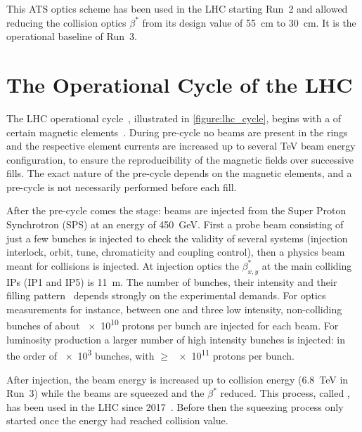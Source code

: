 This ATS optics scheme has been used in the LHC starting Run~\num{2} and allowed reducing the collision optics \(\beta^{\ast}\) from its design value of \qty{55}{\centi\meter} to \qty{30}{\centi\meter}.
It is the operational baseline of Run~\num{3}.


\section{The Operational Cycle of the LHC}
\label{section:lhc_operational_cycle}

The LHC operational cycle~\cite{Report:LHCModes}, illustrated in \cref{figure:lhc_cycle}, begins with a  of certain magnetic elements~\cite{Report:LHCMagnetsPreCycles}.
During pre-cycle no beams are present in the rings and the respective element currents are increased up to several \unit{\tera\electronvolt} beam energy configuration, to ensure the reproducibility of the magnetic fields over successive fills.
The exact nature of the pre-cycle depends on the magnetic elements, and a pre-cycle is not necessarily performed before each fill.

After the pre-cycle comes the  stage: beams are injected from the Super Proton Synchrotron (SPS) at an energy of \qty{450}{\giga\electronvolt}.
First a probe beam consisting of just a few bunches is injected to check the validity of several systems (injection interlock, orbit, tune, chromaticity and coupling control), then a physics beam meant for collisions is injected.
At injection optics the \(\beta^{\ast}_{x,y}\) at the main colliding IPs (IP\num{1} and IP\num{5}) is \qty{11}{\metre}.
The number of bunches, their intensity and their filling pattern~\cite{Report:LHCStandardFillingSchemes} depends strongly on the experimental demands.
For optics measurements for instance, between one and three low intensity, non-colliding bunches of about \num{e10} protons per bunch are injected for each beam.
For luminosity production a larger number of high intensity bunches is injected: in the order of \num{e3} bunches, with \(\ge\) \num{e11} protons per bunch.

After injection, the beam energy is increased up to collision energy (\qty{6.8}{\tera\electronvolt} in Run~3) while the beams are squeezed and the \(\beta^{\ast}\) reduced.
This process, called , has been used in the LHC since 2017~\cite{IPAC:Camillocci:CombinedRampAndSqueeze}.
Before then the squeezing process only started once the energy had reached collision value.

